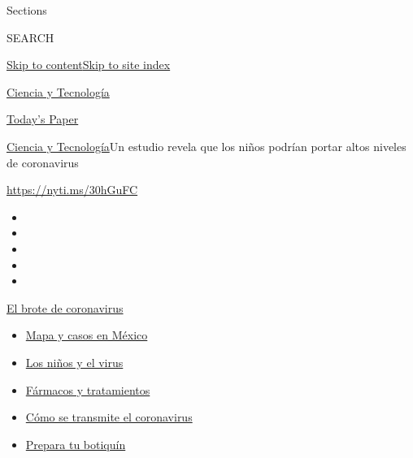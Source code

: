Sections

SEARCH

\protect\hyperlink{site-content}{Skip to
content}\protect\hyperlink{site-index}{Skip to site index}

\href{https://www.nytimes.com/es/section/ciencia-y-tecnologia}{Ciencia y
Tecnología}

\href{https://myaccount.nytimes.com/auth/login?response_type=cookie\&client_id=vi}{}

\href{https://www.nytimes.com/section/todayspaper}{Today's Paper}

\href{/es/section/ciencia-y-tecnologia}{Ciencia y
Tecnología}\textbar{}Un estudio revela que los niños podrían portar
altos niveles de coronavirus

\url{https://nyti.ms/30hGuFC}

\begin{itemize}
\item
\item
\item
\item
\item
\end{itemize}

\href{https://www.nytimes.com/es/spotlight/coronavirus?action=click\&pgtype=Article\&state=default\&region=TOP_BANNER\&context=storylines_menu}{El
brote de coronavirus}

\begin{itemize}
\tightlist
\item
  \href{https://www.nytimes.com/es/interactive/2020/espanol/america-latina/coronavirus-en-mexico.html?action=click\&pgtype=Article\&state=default\&region=TOP_BANNER\&context=storylines_menu}{Mapa
  y casos en México}
\item
  \href{https://www.nytimes.com/es/2020/07/31/espanol/ciencia-y-tecnologia/ninos-contagio-coronavirus.html?action=click\&pgtype=Article\&state=default\&region=TOP_BANNER\&context=storylines_menu}{Los
  niños y el virus}
\item
  \href{https://www.nytimes.com/es/interactive/2020/science/coronavirus-tratamientos-curas.html?action=click\&pgtype=Article\&state=default\&region=TOP_BANNER\&context=storylines_menu}{Fármacos
  y tratamientos}
\item
  \href{https://www.nytimes.com/es/2020/07/06/espanol/ciencia-y-tecnologia/coronavirus-transmision-aire.html?action=click\&pgtype=Article\&state=default\&region=TOP_BANNER\&context=storylines_menu}{Cómo
  se transmite el coronavirus}
\item
  \href{https://www.nytimes.com/es/2020/07/14/espanol/estilos-de-vida/botiquin-medicina-coronavirus.html?action=click\&pgtype=Article\&state=default\&region=TOP_BANNER\&context=storylines_menu}{Prepara
  tu botiquín}
\end{itemize}

